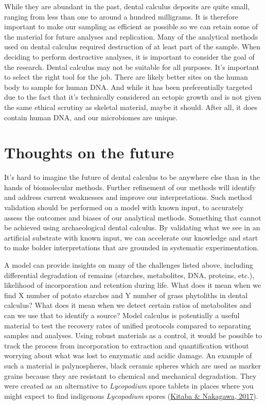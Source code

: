 \documentclass[
  b5paper,
]{book}
\begin{document}
While they are abundant in the past, dental calculus deposits are quite
small, ranging from less than one to around a hundred milligrams. It is
therefore important to make our sampling as efficient as possible so we
can retain some of the material for future analyses and replication.
Many of the analytical methods used on dental calculus required
destruction of at least part of the sample. When deciding to perform
destructive analyses, it is important to consider the goal of the
research. Dental calculus may not be suitable for all purposes. It's
important to select the right tool for the job. There are likely better
sites on the human body to sample for human DNA. And while it has been
preferentially targeted due to the fact that it's technically considered
an ectopic growth and is not given the same ethical scrutiny as skeletal
material, maybe it should. After all, it does contain human DNA, and our
microbiomes are unique.

\hypertarget{thoughts-on-the-future}{%
\section{Thoughts on the future}\label{thoughts-on-the-future}}

It's hard to imagine the future of dental calculus to be anywhere else
than in the hands of biomolecular methods. Further refinement of our
methods will identify and address current weaknesses and improve our
interpretations. Such method validation should be performed on a model
with known input, to accurately assess the outcomes and biases of our
analytical methods. Something that cannot be achieved using
archaeological dental calculus. By validating what we see in an
artificial substrate with known input, we can accelerate our knowledge
and start to make bolder interpretations that are grounded in systematic
experimentation.

A model can provide insights on many of the challenges listed above,
including differential degradation of remains (starches, metabolites,
DNA, proteins, etc.), likelihood of incorporation and retention during
life. What does it mean when we find X number of potato starches and Y
number of grass phytoliths in dental calculus? What does it mean when we
detect certain ratios of metabolites and can we use that to identify a
source? Model calculus is potentially a useful material to test the
recovery rates of unified protocols compared to separating samples and
analyses. Using robust materials as a control, it would be possible to
track the process from incorporation to extraction and quantification
without worrying about what was lost to enzymatic and acidic damage. An
example of such a material is palynospheres, black ceramic spheres which
are used as marker grains because they are resistant to chemical and
mechanical degradation. They were created as an alternative to
\emph{Lycopodium} spore tablets in places where you might expect to find
indigenous \emph{Lycopodium} spores
(\protect\hyperlink{ref-kitabaBlackCeramic2017}{Kitaba \& Nakagawa,
2017}).
\end{document}
